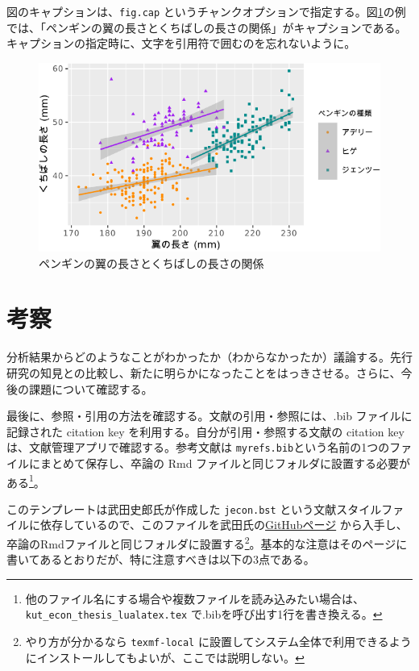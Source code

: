\documentclass[10.5pt,a4paper,lualatex,ja=standard]{bxjsarticle}
\begin{document}
図のキャプションは、\texttt{fig.cap} というチャンクオプションで指定する。図\ref{fig:scat1}の例では、「ペンギンの翼の長さとくちばしの長さの関係」がキャプションである。キャプションの指定時に、文字を引用符で囲むのを忘れないように。

\begin{figure}
\centering
\includegraphics{kut_econ_thesis_rmarkdown_files/figure-latex/scat1-1.pdf}
\caption{\label{fig:scat1}ペンギンの翼の長さとくちばしの長さの関係}
\end{figure}

\section{考察}\label{ux8003ux5bdf}

分析結果からどのようなことがわかったか（わからなかったか）議論する。先行研究の知見との比較し、新たに明らかになったことをはっきさせる。さらに、今後の課題について確認する。

最後に、参照・引用の方法を確認する。文献の引用・参照には、.bib ファイルに記録された citation key を利用する。自分が引用・参照する文献の citation key は、文献管理アプリで確認する。参考文献は \texttt{myrefs.bib}という名前の1つのファイルにまとめて保存し、卒論の Rmd ファイルと同じフォルダに設置する必要がある\footnote{他のファイル名にする場合や複数ファイルを読み込みたい場合は、\texttt{kut\_econ\_thesis\_lualatex.tex} で.bibを呼び出す1行を書き換える。}。

このテンプレートは武田史郎氏が作成した \texttt{jecon.bst} という文献スタイルファイルに依存しているので、このファイルを武田氏の\href{https://github.com/ShiroTakeda/jecon-bst/}{GitHubページ} から入手し、卒論のRmdファイルと同じフォルダに設置する\footnote{やり方が分かるなら \texttt{texmf-local} に設置してシステム全体で利用できるようにインストールしてもよいが、ここでは説明しない。}。基本的な注意はそのページに書いてあるとおりだが、特に注意すべきは以下の3点である。
\end{document}
